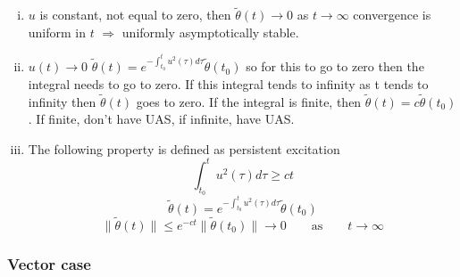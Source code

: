 \begin{enumerate}[(i)]
  \item{$u$ is constant, not equal to zero, then $\tilde{\theta}(t)\rightarrow0$ as $t\rightarrow\infty$ convergence is uniform in $t$ $\Rightarrow$ uniformly asymptotically stable.}
  \item{$u(t)\rightarrow0$ $\tilde{\theta}(t)=e^{-\int_{t_{0}}^{t}u^{2}(\tau)d\tau}\tilde{\theta}(t_{0})$ so for this to go to zero then the integral needs to go to zero.
  If this integral tends to infinity as t tends to infinity then $\tilde{\theta}(t)$ goes to zero.
  If the integral is finite, then $\tilde{\theta}(t)=c\tilde{\theta}(t_{0})$.
  If finite, don't have UAS, if infinite, have UAS.}
  \item{The following property is defined as persistent excitation}
  \begin{equation*}
    \int_{t_{0}}^{t}u^{2}(\tau)d\tau\geq ct
  \end{equation*}
  \begin{equation*}
    \tilde{\theta}(t)=e^{-\int_{t_{0}}^{t}u^{2}(\tau)d\tau}\tilde{\theta}(t_{0})
  \end{equation*}
  \begin{equation*}
    \|\tilde{\theta}(t)\|\leq e^{-ct}\|\tilde{\theta}(t_{0})\|\rightarrow0
    \qquad
    \text{as}
    \qquad
    t\rightarrow\infty
  \end{equation*}
\end{enumerate}

\subsubsection{Vector case}

